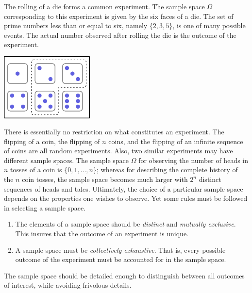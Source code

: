 \begin{example}
The rolling of a die forms a common experiment.
The sample space $\Omega$ corresponding to this experiment is given by the six faces of a die.
The set of prime numbers less than or equal to six, namely $\{ 2, 3, 5 \}$, is one of many possible events.
The actual number observed after rolling the die is the outcome of the experiment.

\begin{center}
\includegraphics[height=3.375cm]{Figures/2Chapter/dices}
\end{center}
\end{example}

There is essentially no restriction on what constitutes an experiment.
The flipping of a coin, the flipping of $n$ coins, and the flipping of an infinite sequence of coins are all random experiments.
Also, two similar experiments may have different sample spaces.
The sample space $\Omega$ for observing the number of heads in $n$ tosses of a coin is $\{ 0, 1, \ldots, n \}$; whereas for describing the complete history of the $n$ coin tosses, the sample space becomes much larger with $2^n$ distinct sequences of heads and tales.
Ultimately, the choice of a particular sample space depends on the properties one wishes to observe.
Yet some rules must be followed in selecting a sample space.
\begin{enumerate}
\item The elements of a sample space should be \emph{distinct} and \emph{mutually exclusive}.  
This insures that the outcome of an experiment is unique.
\item A sample space must be \emph{collectively exhaustive}. 
That is, every possible outcome of the experiment must be accounted for in the sample space.
\end{enumerate}
The sample space should be detailed enough to distinguish between all outcomes of interest, while avoiding frivolous details.

